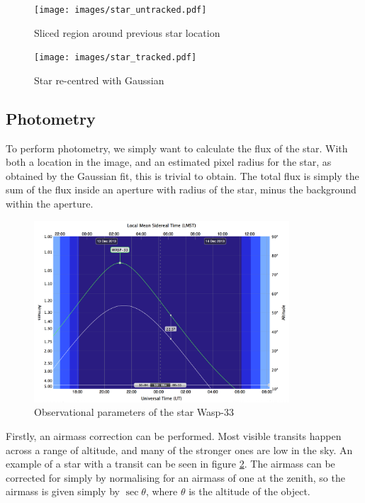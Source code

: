 \begin{figure}[ht]
    \centering
    \begin{minipage}[b]{\figwidth}
        \centering
        \texttt{[image: images/star\_untracked.pdf]}
        \caption{Sliced region around previous star location}
        \label{fig:untracked_star}
    \end{minipage}\quad\quad
    \begin{minipage}[b]{\figwidth}
        \texttt{[image: images/star\_tracked.pdf]}
        \caption{Star re-centred with Gaussian}
        \label{fig:tracked_Star}
    \end{minipage}
\end{figure}
\subsection{Photometry}

To perform photometry, we simply want to calculate the flux of the star. With both a location in the image, and an estimated pixel radius for the star, as obtained by the Gaussian fit, this is trivial to obtain. The total flux is simply the sum of the flux inside an aperture with radius of the star, minus the background within the aperture.

\begin{figure}[ht]
    \centering
    \includegraphics[width=0.85\textwidth]{images/airmass.png}
    \caption{Observational parameters of the star Wasp-33}
    \label{fig:airmass}
\end{figure}

Firstly, an airmass correction can be performed. Most visible transits happen across a range of altitude, and many of the stronger ones are low in the sky. An example of a star with a transit can be seen in figure \ref{fig:airmass}. The airmass can be corrected for simply by normalising for an airmass of one at the zenith, so the airmass is given simply by $\sec \theta$, where $\theta$ is the altitude of the object.


